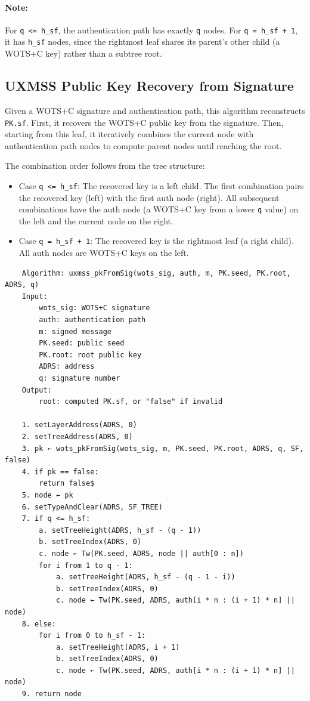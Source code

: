 \paragraph{Note:} For \texttt{q <= h\_sf}, the authentication path has exactly \texttt{q} nodes. For \texttt{q = h\_sf + 1}, it has \texttt{h\_sf} nodes, since the rightmost leaf shares its parent's other child (a WOTS+C key) rather than a subtree root.

\subsection{UXMSS Public Key Recovery from Signature}
Given a WOTS+C signature and authentication path, this algorithm reconstructs \texttt{PK.sf}. First, it recovers the WOTS+C public key from the signature. Then, starting from this leaf, it iteratively combines the current node with authentication path nodes to compute parent nodes until reaching the root.

The combination order follows from the tree structure:
\begin{itemize}
    \item Case \texttt{q <= h\_sf}: The recovered key is a left child. The first combination pairs the recovered key (left) with the first auth node (right). All subsequent combinations have the auth node (a WOTS+C key from a lower \texttt{q} value) on the left and the current node on the right.
    \item Case \texttt{q = h\_sf + 1}: The recovered key is the rightmost leaf (a right child). All auth nodes are WOTS+C keys on the left.
\end{itemize}

\begin{verbatim}
    Algorithm: uxmss_pkFromSig(wots_sig, auth, m, PK.seed, PK.root, ADRS, q)
    Input:
        wots_sig: WOTS+C signature
        auth: authentication path 
        m: signed message
        PK.seed: public seed
        PK.root: root public key
        ADRS: address
        q: signature number
    Output:
        root: computed PK.sf, or "false" if invalid

    1. setLayerAddress(ADRS, 0)
    2. setTreeAddress(ADRS, 0)
    3. pk ← wots_pkFromSig(wots_sig, m, PK.seed, PK.root, ADRS, q, SF, false)
    4. if pk == false:
        return false$
    5. node ← pk
    6. setTypeAndClear(ADRS, SF_TREE)
    7. if q <= h_sf:
        a. setTreeHeight(ADRS, h_sf - (q - 1))
        b. setTreeIndex(ADRS, 0)
        c. node ← Tw(PK.seed, ADRS, node || auth[0 : n])
        for i from 1 to q - 1:
            a. setTreeHeight(ADRS, h_sf - (q - 1 - i))
            b. setTreeIndex(ADRS, 0)
            c. node ← Tw(PK.seed, ADRS, auth[i * n : (i + 1) * n] || node)
    8. else:  
        for i from 0 to h_sf - 1:
            a. setTreeHeight(ADRS, i + 1)
            b. setTreeIndex(ADRS, 0)
            c. node ← Tw(PK.seed, ADRS, auth[i * n : (i + 1) * n] || node)
    9. return node
\end{verbatim}

